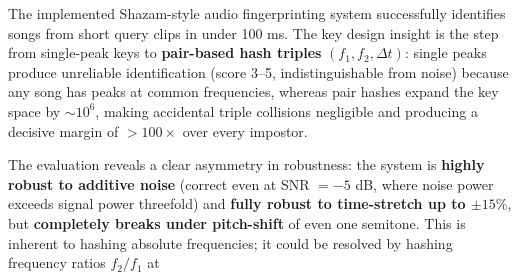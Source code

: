 \documentclass[11pt,a4paper]{article}
\begin{document}
The implemented Shazam-style audio fingerprinting system successfully identifies songs
from short query clips in under 100 ms. The key design insight is the step from
single-peak keys to \textbf{pair-based hash triples} $(f_1, f_2, \Delta t)$: single
peaks produce unreliable identification (score 3--5, indistinguishable from noise)
because any song has peaks at common frequencies, whereas pair hashes expand the
key space by $\sim$$10^6$, making accidental triple collisions negligible and producing
a decisive margin of $>100\times$ over every impostor.

The evaluation reveals a clear asymmetry in robustness: the system is \textbf{highly
robust to additive noise} (correct even at SNR $= -5$ dB, where noise power exceeds
signal power threefold) and \textbf{fully robust to time-stretch up to $\pm15\%$}, but
\textbf{completely breaks under pitch-shift} of even one semitone. This is inherent to
hashing absolute frequencies; it could be resolved by hashing frequency ratios
$f_2/f_1$ at
\end{document}
